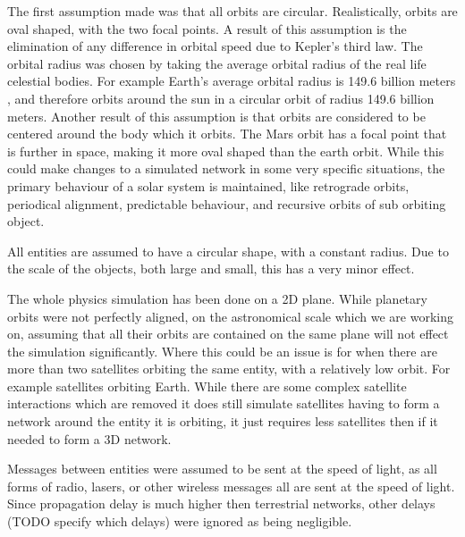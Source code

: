 \documentclass[a4paper,12pt]{article}
\begin{document}
The first assumption made was that all orbits are circular. Realistically, orbits are oval 
shaped, with the two focal points. A result of this assumption is the elimination of any 
difference in orbital speed due to Kepler's third law. The orbital radius was chosen by taking
the average orbital radius of the real life celestial bodies.
For example Earth's average orbital
radius is 149.6 billion meters \cite{}, and therefore orbits around the sun in a circular orbit
of radius 149.6 billion meters.  Another result of this assumption 
is that orbits are considered to be centered around the body which it orbits. The Mars orbit 
has a focal point that is further in space, making it more oval shaped than the earth orbit. \cite{} 
While this could make changes to a 
simulated network in some very specific situations, the primary behaviour of a solar system 
is maintained, like retrograde orbits, periodical alignment, predictable behaviour, and 
recursive orbits of sub orbiting object.

All entities are assumed to have a circular shape, with a constant radius. Due to the scale of the 
objects, both large and small, this has a very minor effect.

The whole physics simulation has been done on a 2D plane. While planetary orbits were not perfectly
aligned, on the astronomical scale which we are working on, assuming that all their orbits are 
contained on the same plane will not effect the simulation significantly. Where this could be an issue 
is for when there are more than two satellites orbiting the same entity, with a relatively low orbit. For
example satellites orbiting Earth. While there are some complex satellite interactions which are removed 
it does still simulate satellites having to form a network around the entity it is 
orbiting, it just requires less satellites then if it needed to form a 3D network. 

Messages between entities were assumed to be sent at the speed of light, as all forms of radio, lasers,
or other wireless messages all are sent at the speed of light. Since propagation delay is much higher 
then terrestrial networks, other delays (TODO specify which delays) were ignored as being negligible. 
\end{document}
